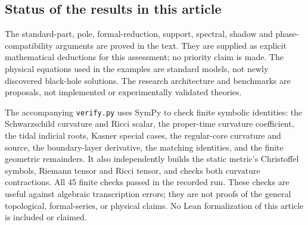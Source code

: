 \documentclass[11pt,a4paper]{article}
\numberwithin{equation}{section}
\theoremstyle{definition}
\theoremstyle{remark}
\begin{document}
\subsection{Status of the results in this article}
The standard-part, pole, formal-reduction, support, spectral, shadow and
phase-compatibility arguments are proved in the text. They are supplied as
explicit mathematical deductions for this assessment; no priority claim is
made. The physical equations used in the examples are standard models, not
newly discovered black-hole solutions. The research architecture and benchmarks
are proposals, not implemented or experimentally validated theories.

The accompanying \texttt{verify.py} uses SymPy to check finite symbolic
identities: the Schwarzschild curvature and Ricci scalar, the proper-time
curvature coefficient, the tidal indicial roots, Kasner special cases, the
regular-core curvature and source, the boundary-layer derivative, the matching
identities, and the finite geometric remainders. It also independently builds
the static metric's Christoffel symbols, Riemann tensor and Ricci tensor, and
checks both curvature contractions. All 45 finite checks passed in the
recorded run. These checks are useful against algebraic transcription errors; they
are not proofs of the general topological, formal-series, or physical claims.
No Lean formalization of this article is included or claimed.

\clearpage
\end{document}
